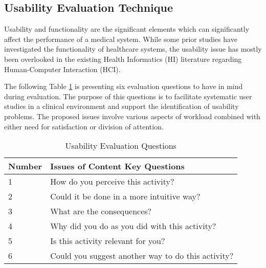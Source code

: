 \hfill

\clearpage


\subsection{Usability Evaluation Technique}

Usability and functionality are the significant elements which can significantly affect the performance of a medical system. While some prior studies \cite{Calisto:2017:TTM:3132272.3134111} have investigated the functionality of healthcare systems, the usability issue has mostly been overlooked in the existing Health Informatics (HI) literature regarding Human-Computer Interaction (HCI).

The following Table \ref{table:key_questions} is presenting six evaluation questions to have in mind during evaluation. The purpose of this questions is to facilitate systematic user studies in a clinical environment and support the identification of usability problems. The proposed issues involve various aspects of workload combined with either need for satisfaction or division of attention.

\begin{table}[h]
\centering
\label{table:key_questions}
\begin{tabular}{l|l}
Number & Issues of Content Key Questions                    \\ \hline
1      & How do you perceive this activity?                 \\
2      & Could it be done in a more intuitive way?          \\
3      & What are the consequences?                         \\
4      & Why did you do as you did with this activity?      \\
5      & Is this activity relevant for you?                 \\
6      & Could you suggest another way to do this activity?
\end{tabular}
\caption{Usability Evaluation Questions}
\end{table}

